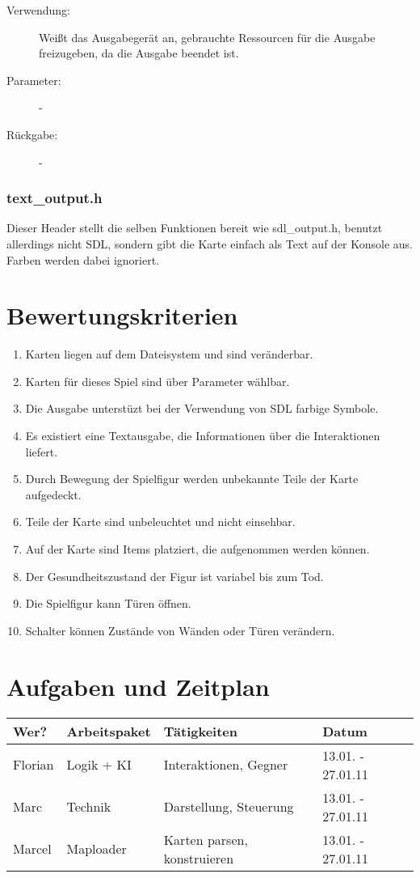 \documentclass[11pt,a4paper,notitlepage]{report}
\begin{document}
	\begin{description}
		\item[Verwendung:] Weißt das Ausgabegerät an, gebrauchte Ressourcen für die Ausgabe freizugeben, da die Ausgabe beendet ist.
		\item[Parameter:] -
		\item[Rückgabe:] -
	\end{description}

	\subsubsection*{text\_output.h}
	Dieser Header stellt die selben Funktionen bereit wie sdl\_output.h, benutzt allerdings nicht SDL, sondern gibt die Karte einfach als Text auf der Konsole aus. Farben werden dabei ignoriert.


	\newpage
	\section*{Bewertungskriterien}
	\begin{enumerate}
	  \item Karten liegen auf dem Dateisystem und sind veränderbar.
		\item Karten für dieses Spiel sind über Parameter wählbar.
		\item Die Ausgabe unterstüzt bei der Verwendung von SDL farbige Symbole.
		\item Es existiert eine Textausgabe, die Informationen über die Interaktionen liefert.
		\item Durch Bewegung der Spielfigur werden unbekannte Teile der Karte aufgedeckt.
		\item Teile der Karte sind unbeleuchtet und nicht einsehbar.
		\item Auf der Karte sind Items platziert, die aufgenommen werden können.
		\item Der Gesundheitszustand der Figur ist variabel bis zum Tod.
		\item Die Spielfigur kann Türen öffnen.
		\item Schalter können Zustände von Wänden oder Türen verändern.
	\end{enumerate}
	
	\newpage
	\section*{Aufgaben und Zeitplan}

	\begin{tabular}{ p{3.5cm} | p{3.5cm} | p{5.0cm} | p{3.0cm} }
		Wer? & Arbeitspaket & Tätigkeiten & Datum \\
		\hline
		Florian & Logik + KI & Interaktionen, Gegner & 13.01. - 27.01.11 \\
		Marc & Technik & Darstellung, Steuerung & 13.01. - 27.01.11 \\
		Marcel & Maploader & Karten parsen, konstruieren & 13.01. - 27.01.11
	\end{tabular}
\end{document}
